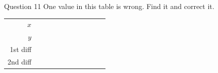 \documentclass[11pt]{article}
\begin{document}
\begin{qbox}{Question 11}
One value in this table is wrong. Find it and correct it.
\begin{center}\renewcommand{\arraystretch}{1.15}\setlength{\tabcolsep}{2pt}\begin{tabular}{r|>{\centering\arraybackslash}p{0.62cm}>{\centering\arraybackslash}p{0.62cm}>{\centering\arraybackslash}p{0.62cm}>{\centering\arraybackslash}p{0.62cm}>{\centering\arraybackslash}p{0.62cm}>{\centering\arraybackslash}p{0.62cm}>{\centering\arraybackslash}p{0.62cm}>{\centering\arraybackslash}p{0.62cm}>{\centering\arraybackslash}p{0.62cm}>{\centering\arraybackslash}p{0.62cm}}
$x$ & \multicolumn{2}{c}{\colorbox{iagreen}{\makebox[1.12cm]{\strut \color{white}\bfseries $0$}}} & \multicolumn{2}{c}{\colorbox{iagreen}{\makebox[1.12cm]{\strut \color{white}\bfseries $1$}}} & \multicolumn{2}{c}{\colorbox{iagreen}{\makebox[1.12cm]{\strut \color{white}\bfseries $2$}}} & \multicolumn{2}{c}{\colorbox{iagreen}{\makebox[1.12cm]{\strut \color{white}\bfseries $3$}}} & \multicolumn{2}{c}{\colorbox{iagreen}{\makebox[1.12cm]{\strut \color{white}\bfseries $4$}}} \\[2pt]
$y$ & \multicolumn{2}{c}{\colorbox{keybg}{\makebox[1.12cm]{\strut $1$}}} & \multicolumn{2}{c}{\colorbox{keybg}{\makebox[1.12cm]{\strut $4$}}} & \multicolumn{2}{c}{\colorbox{keybg}{\makebox[1.12cm]{\strut $9$}}} & \multicolumn{2}{c}{\colorbox{keybg}{\makebox[1.12cm]{\strut $17$}}} & \multicolumn{2}{c}{\colorbox{keybg}{\makebox[1.12cm]{\strut $25$}}} \\[2pt]
\textcolor{exblue}{\scriptsize 1st diff} & & \multicolumn{2}{c}{\colorbox{exbg}{\makebox[1.12cm]{\strut \textcolor{exblue}{$+3$}}}} & \multicolumn{2}{c}{\colorbox{exbg}{\makebox[1.12cm]{\strut \textcolor{exblue}{$+5$}}}} & \multicolumn{2}{c}{\colorbox{exbg}{\makebox[1.12cm]{\strut \textcolor{exblue}{$+8$}}}} & \multicolumn{2}{c}{\colorbox{exbg}{\makebox[1.12cm]{\strut \textcolor{exblue}{$+8$}}}} & \\[2pt]
\textcolor{qorange}{\scriptsize 2nd diff} & & & \multicolumn{2}{c}{\colorbox{qbg}{\makebox[1.12cm]{\strut \textcolor{qorange!70!black}{$+2$}}}} & \multicolumn{2}{c}{\colorbox{qbg}{\makebox[1.12cm]{\strut \textcolor{qorange!70!black}{$+3$}}}} & \multicolumn{2}{c}{\colorbox{qbg}{\makebox[1.12cm]{\strut \textcolor{qorange!70!black}{$+0$}}}} & & \\
\end{tabular}\end{center}\workspace{2.2cm}
\end{qbox}
\end{document}

